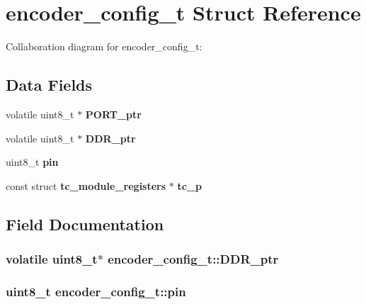 \section{encoder\+\_\+config\+\_\+t Struct Reference}
\label{structencoder__config__t}


Collaboration diagram for encoder\+\_\+config\+\_\+t\+:
\subsection*{Data Fields}
\begin{DoxyCompactItemize}
\item 
volatile uint8\+\_\+t $\ast$ {\bf P\+O\+R\+T\+\_\+ptr}
\item 
volatile uint8\+\_\+t $\ast$ {\bf D\+D\+R\+\_\+ptr}
\item 
uint8\+\_\+t {\bf pin}
\item 
const struct {\bf tc\+\_\+module\+\_\+registers} $\ast$ {\bf tc\+\_\+p}
\end{DoxyCompactItemize}


\subsection{Field Documentation}
\subsubsection[{D\+D\+R\+\_\+ptr}]{\setlength{\rightskip}{0pt plus 5cm}volatile uint8\+\_\+t$\ast$ encoder\+\_\+config\+\_\+t\+::\+D\+D\+R\+\_\+ptr}\label{structencoder__config__t_a5dc1a4776f66ab5e5eacce4ccbb048b2}
\subsubsection[{pin}]{\setlength{\rightskip}{0pt plus 5cm}uint8\+\_\+t encoder\+\_\+config\+\_\+t\+::pin}\label{structencoder__config__t_ad48157b503f3847e3b08bc3e204a0d47}
